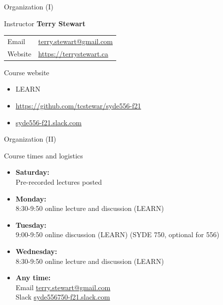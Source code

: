\documentclass[aspectratio=169]{beamer}
\begin{document}
\begin{frame}{Organization (I)}
	\begin{block}{Instructor}
		\vspace{2mm}
		\textbf{Terry Stewart}\\[2mm]
		\hspace{-2.5mm}\begin{tabular}{l l}
			Email & \url{terry.stewart@gmail.com}\\
			Website & \url{https://terrystewart.ca}\\
		\end{tabular}
	\end{block}
 
	\vfill

	\begin{block}{Course website}
		\begin{itemize}
			\item LEARN
			\item \url{https://github.com/tcstewar/syde556-f21}
			\item \url{syde556-f21.slack.com}
		\end{itemize}
	\end{block}
\end{frame}

\begin{frame}{Organization (II)}
	\begin{block}{Course times and logistics}
		\begin{itemize}
			\item \textbf{Saturday:}\\
			Pre-recorded lectures posted
			\item \textbf{Monday:}\\
			8:30-9:50 online lecture and discussion (LEARN)
			\item \textbf{Tuesday:}\\9:00-9:50 online discussion (LEARN) (SYDE 750, optional for 556)
			\item \textbf{Wednesday:}\\
			8:30-9:50 online lecture and discussion (LEARN) 
			\item \textbf{Any time:}\\
Email \url{terry.stewart@gmail.com}\\ Slack \url{syde556750-f21.slack.com} 
		\end{itemize}
	\end{block}

\end{frame}
\end{document}
